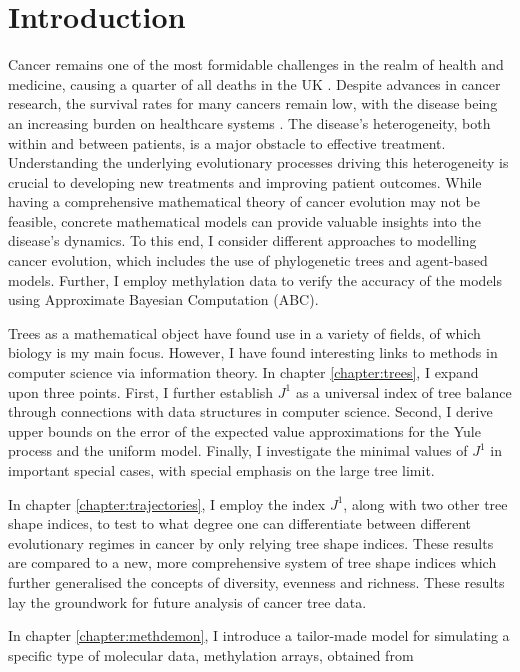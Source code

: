 \chapter{Introduction}\label{chapter:introduction}
Cancer remains one of the most formidable challenges in the realm of health and
medicine, causing a quarter of all deaths in the UK
\cite{noauthor_cancer_2015}. Despite advances in cancer research, the survival
rates for many cancers remain low, with the disease being an increasing burden
on healthcare systems \cite{noauthor_financial_nodate}. The disease's
heterogeneity, both within and between patients, is a major obstacle to
effective treatment. Understanding the underlying evolutionary processes
driving this heterogeneity is crucial to developing new treatments and
improving patient outcomes. While having a comprehensive mathematical theory of
cancer evolution may not be feasible, concrete mathematical models can provide
valuable insights into the disease's dynamics. To this end, I consider
different approaches to modelling cancer evolution, which includes the use of
phylogenetic trees and agent-based models. Further, I employ methylation data
to verify the accuracy of the models using Approximate Bayesian Computation
(ABC).\par
Trees as a mathematical object have found use in a variety of fields, of which
biology is my main focus. However, I have found interesting links to methods in
computer science via information theory. In chapter \ref{chapter:trees}, I
expand upon three points. First, I further establish $J^1$ as a universal index
of tree balance through connections with data structures in computer science.
Second, I derive upper bounds on the error of the expected value approximations
for the Yule process and the uniform model. Finally, I investigate the minimal
values of $J^1$ in important special cases, with special emphasis on the large
tree limit. \par
In chapter \ref{chapter:trajectories}, I employ the index $J^1$, along with two
other tree shape indices, to test to what degree one can differentiate between
different evolutionary regimes in cancer by only relying tree shape indices.
These results are compared to a new, more comprehensive system of tree shape
indices \cite{noble_new_2023} which further generalised the concepts of
diversity, evenness and richness. These results lay the groundwork for future
analysis of cancer tree data.\par
In chapter \ref{chapter:methdemon}, I introduce a tailor-made model for
simulating a specific type of molecular data, methylation arrays, obtained from
